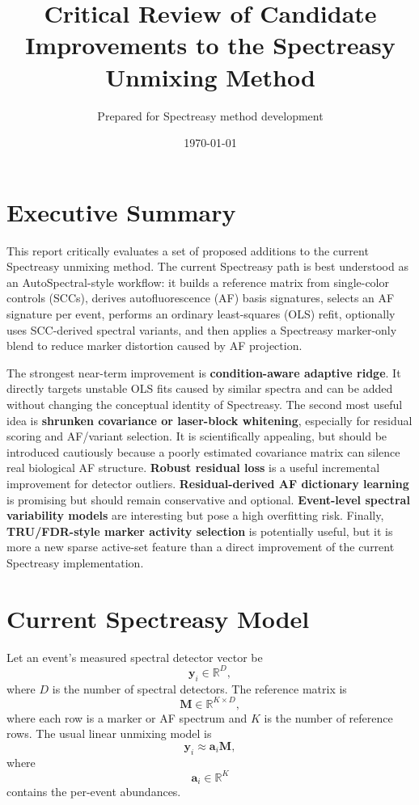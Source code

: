 \documentclass[11pt]{article}
\title{Critical Review of Candidate Improvements to the Spectreasy Unmixing Method}
\author{Prepared for Spectreasy method development}
\date{\today}
\newcommand{\y}{\mathbf{y}}
\newcommand{\M}{\mathbf{M}}
\newcommand{\aev}{\mathbf{a}}
\begin{document}
\maketitle

\section*{Executive Summary}

This report critically evaluates a set of proposed additions to the current
Spectreasy unmixing method. The current Spectreasy path is best understood as
an AutoSpectral-style workflow: it builds a reference matrix from single-color
controls (SCCs), derives autofluorescence (AF) basis signatures, selects an AF
signature per event, performs an ordinary least-squares (OLS) refit, optionally
uses SCC-derived spectral variants, and then applies a Spectreasy marker-only
blend to reduce marker distortion caused by AF projection.

The strongest near-term improvement is \textbf{condition-aware adaptive ridge}.
It directly targets unstable OLS fits caused by similar spectra and can be added
without changing the conceptual identity of Spectreasy. The second most useful
idea is \textbf{shrunken covariance or laser-block whitening}, especially for
residual scoring and AF/variant selection. It is scientifically appealing, but
should be introduced cautiously because a poorly estimated covariance matrix can
silence real biological AF structure. \textbf{Robust residual loss} is a useful
incremental improvement for detector outliers. \textbf{Residual-derived AF
dictionary learning} is promising but should remain conservative and optional.
\textbf{Event-level spectral variability models} are interesting but pose a
high overfitting risk. Finally, \textbf{TRU/FDR-style marker activity selection}
is potentially useful, but it is more a new sparse active-set feature than a
direct improvement of the current Spectreasy implementation.

\section{Current Spectreasy Model}

Let an event's measured spectral detector vector be
\begin{equation}
  \y_i \in \mathbb{R}^{D},
\end{equation}
where \(D\) is the number of spectral detectors. The reference matrix is
\begin{equation}
  \M \in \mathbb{R}^{K \times D},
\end{equation}
where each row is a marker or AF spectrum and \(K\) is the number of reference
rows. The usual linear unmixing model is
\begin{equation}
  \y_i \approx \aev_i \M,
\end{equation}
where
\begin{equation}
  \aev_i \in \mathbb{R}^{K}
\end{equation}
contains the per-event abundances.
\end{document}
